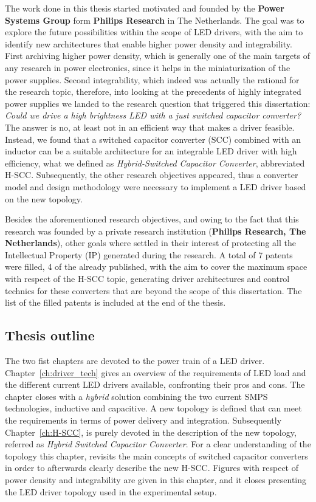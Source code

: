 The work done in this thesis started motivated and founded by the \textbf{Power Systems Group} form  \textbf{Philips Research} in The Netherlands. The goal was to explore the future possibilities within the scope of LED drivers, with the aim to identify new architectures that enable higher power density and integrability. First archiving higher power density, which is generally one of the main targets of any research in power electronics, since it helps in the miniaturization of the power supplies. Second integrability, which indeed was actually the rational for the research topic, therefore, into looking at the precedents of highly integrated power supplies we landed to the research question that triggered this dissertation: \emph{Could we drive a high brightness LED with a just switched capacitor converter?} The answer is no, at least not in an efficient way that makes a driver feasible. Instead, we found that a switched capacitor converter (SCC) combined with an inductor can be a suitable architecture for an integrable LED driver with high efficiency, what we defined as \emph{Hybrid-Switched Capacitor Converter}, abbreviated H-SCC. Subsequently, the other research objectives appeared, thus a converter model and design methodology were necessary to implement a LED driver based on the new topology.

Besides the aforementioned research objectives, and owing to the fact that this research was founded by a private research institution (\textbf{Philips Research, The Netherlands}), other goals where settled in their interest of protecting all the Intellectual Property (IP) generated during the research. A total of 7 patents were filled, 4 of the already published, with the aim to cover the maximum space with respect of the H-SCC topic, generating driver architectures and control technics for these converters that are beyond the scope of this dissertation. The list of the filled patents is included at the end of the thesis. 
 
\subsection{Thesis outline}
The two fist chapters are devoted to the power train of a LED driver. Chapter~\ref{ch:driver_tech} gives an overview of the requirements of LED load and the different current LED drivers available, confronting their pros and cons. The chapter closes with a \emph{hybrid} solution combining the two current SMPS technologies, inductive and capacitive. A new topology is defined that can meet the requirements in terms of power delivery and integration. Subsequently Chapter~\ref{ch:H-SCC}, is purely devoted in the description of the new topology, referred as \emph{Hybrid Switched Capacitor Converter}. For a clear understanding of the topology this chapter, revisits the main concepts of switched capacitor converters in order to afterwards clearly describe the new H-SCC. Figures with respect of power density and integrability are given in this chapter, and it closes presenting the LED driver topology used in the experimental setup.

